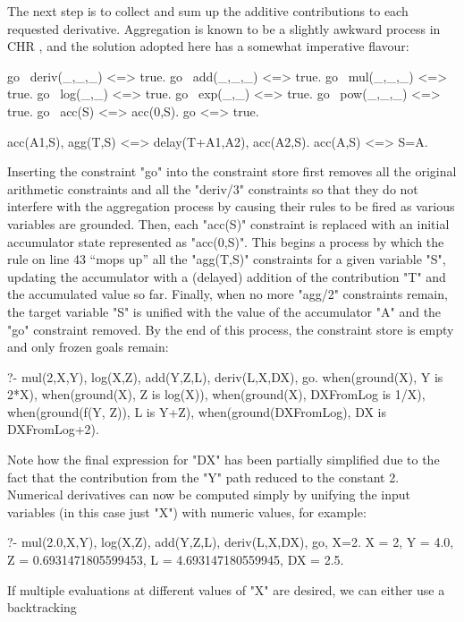 The next step is to collect and sum up the additive contributions to each
requested derivative. Aggregation is known to be a slightly awkward process
in CHR \citep{SneyersVan-WeertSchrijvers2007}, and the solution adopted here has a somewhat
imperative flavour:
\begin{prolog-framed}[name=adone,numbers=left,firstnumber=34]
	go \ deriv(_,_,_) <=> true.
	go \ add(_,_,_)   <=> true.
	go \ mul(_,_,_)   <=> true.
	go \ log(_,_)     <=> true.
	go \ exp(_,_)     <=> true.
	go \ pow(_,_,_)   <=> true.
	go \ acc(S)       <=> acc(0,S).
	go <=> true.

	acc(A1,S), agg(T,S) <=> delay(T+A1,A2), acc(A2,S).
	acc(A,S) <=> S=A.
\end{prolog-framed}
Inserting the constraint "go" into the constraint store first removes all the original
arithmetic constraints and all the "deriv/3" constraints so that they do not interfere with
the aggregation process by causing their rules to be fired as various variables are grounded. Then,
each "acc(S)" constraint is replaced with an initial accumulator state represented as
"acc(0,S)". This begins a process by which the rule on line 43 ``mops up'' all the
"agg(T,S)" constraints for a given variable "S", updating the accumulator with a (delayed)
addition of the contribution "T" and the accumulated value so far.
Finally, when no more "agg/2" constraints remain, the target variable "S" is unified with
the value of the accumulator "A" and the "go" constraint removed.
By the end of this process, the constraint store is empty and only frozen goals remain:
\begin{prolog-barred}
	?- mul(2,X,Y), log(X,Z), add(Y,Z,L), deriv(L,X,DX), go.
	when(ground(X), Y is 2*X),
	when(ground(X), Z is log(X)),
	when(ground(X), DXFromLog is 1/X),
	when(ground(f(Y, Z)), L is Y+Z),
	when(ground(DXFromLog), DX is DXFromLog+2).
\end{prolog-barred}
Note how the final expression for "DX" has been partially simplified due to the fact
that the contribution from the "Y" path reduced to the constant 2. Numerical derivatives can
now be computed simply by unifying the input variables (in this case just "X") with numeric
values, for example:
\begin{prolog-barred}
	?- mul(2.0,X,Y), log(X,Z), add(Y,Z,L), deriv(L,X,DX), go, X=2.
	X = 2,
	Y = 4.0,
	Z = 0.6931471805599453,
	L = 4.693147180559945,
	DX = 2.5.
\end{prolog-barred}
If multiple evaluations at different values of "X" are desired, we can either use a backtracking
